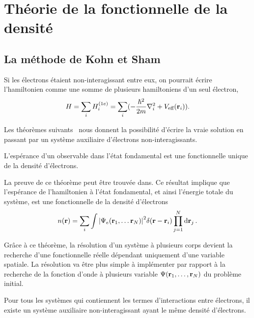 \section{Théorie de la fonctionnelle de la densité}
\subsection{La méthode de Kohn et Sham}
\label{subsec-KS}
Si les électrons étaient non-interagissant entre eux,
on pourrait écrire l'hamiltonien comme une somme de plusieurs hamiltoniens d'un seul électron, \ie{}
\begin{equation}
  H = \sum_i H_i^{(1e)} = \sum_i (-\frac{\hslash^2}{2m}\laplacian_i + V_{\V{eff}}(\vb{r}_i)).
\end{equation}

Les théorèmes suivants~\cite{Hohenberg1964, Kohn1965} nous donnent la possibilité d'écrire
la vraie solution en passant par un système auxiliaire d'électrons non-interagissants.

\begin{theoreme}
  L'espérance d'un observable dans l'état fondamental est une fonctionnelle unique
  de la densité d'électrons.
\end{theoreme}

La preuve de ce théorème peut être trouvée dans.
Ce résultat implique que l'espérance de l'hamiltonien à l'état fondamental,
et ainsi l'énergie totale du système, est une fonctionnelle de la densité d'électrons
\begin{equation*}
n(\vb{r}) = \sum_i \int \abs{\Psi_e(\vb{r}_1, \ldots \vb{r}_N)}^2 \delta(\vb{r} - \vb{r}_i) \prod_{j=1}^N \dd{\vb{r}_j}.
\end{equation*}

Grâce à ce théorème, la résolution d'un système à plusieurs corps devient
la recherche d'une fonctionnelle réelle dépendant uniquement d'une variable spatiale.
La résolution va être plus simple à implémenter par rapport à la recherche de la fonction d'onde
à plusieurs variable $\Psi (\vb{r}_1, \ldots, \vb{r}_N)$ du problème initial.

\begin{theoreme}
\label{thm-ks}
  Pour tous les systèmes qui contiennent les termes d'interactions entre électrons,
  il existe un système auxiliaire non-interagissant ayant le même densité d'électrons.
\end{theoreme}

